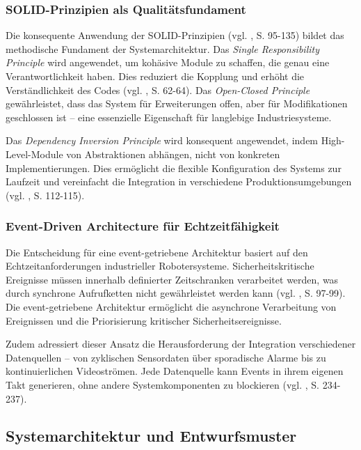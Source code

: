 \subsubsection{SOLID-Prinzipien als Qualitätsfundament}
Die konsequente Anwendung der SOLID-Prinzipien (vgl. \cite{Martin2003}, S.
95-135) bildet das methodische Fundament der Systemarchitektur. Das
\textit{Single Responsibility Principle} wird angewendet, um kohäsive Module zu
schaffen, die genau eine Verantwortlichkeit haben. Dies reduziert die Kopplung
und erhöht die Verständlichkeit des Codes (vgl. \cite{Martin2017}, S. 62-64).
Das \textit{Open-Closed Principle} gewährleistet, dass das System für
Erweiterungen offen, aber für Modifikationen geschlossen ist – eine essenzielle
Eigenschaft für langlebige Industriesysteme.

Das \textit{Dependency Inversion Principle} wird konsequent angewendet, indem
High-Level-Module von Abstraktionen abhängen, nicht von konkreten
Implementierungen. Dies ermöglicht die flexible Konfiguration des Systems zur
Laufzeit und vereinfacht die Integration in verschiedene Produktionsumgebungen
(vgl. \cite{Fowler2018}, S. 112-115).

\subsubsection{Event-Driven Architecture für Echtzeitfähigkeit}
Die Entscheidung für eine event-getriebene Architektur basiert auf den
Echtzeitanforderungen industrieller Robotersysteme. Sicherheitskritische
Ereignisse müssen innerhalb definierter Zeitschranken verarbeitet werden, was
durch synchrone Aufrufketten nicht gewährleistet werden kann (vgl.
\cite{Hohpe2003}, S. 97-99). Die event-getriebene Architektur ermöglicht die
asynchrone Verarbeitung von Ereignissen und die Priorisierung kritischer
Sicherheitsereignisse.

Zudem adressiert dieser Ansatz die Herausforderung der Integration
verschiedener Datenquellen – von zyklischen Sensordaten über sporadische Alarme
bis zu kontinuierlichen Videoströmen. Jede Datenquelle kann Events in ihrem
eigenen Takt generieren, ohne andere Systemkomponenten zu blockieren (vgl.
\cite{Vernon2013}, S. 234-237).

\subsection{Systemarchitektur und Entwurfsmuster}

